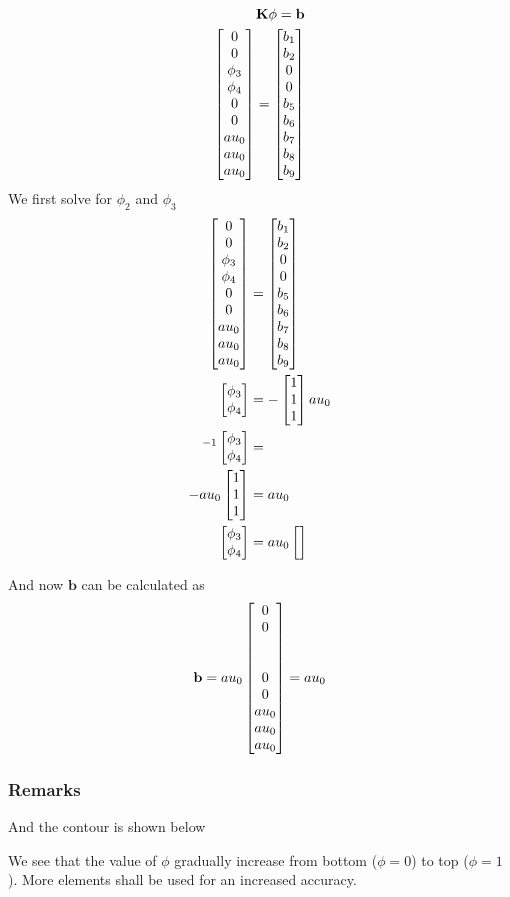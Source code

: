 \begin{align*}
  \K \mathbf{\phi} = \mathbf{b} \notag\\
  \G{K.g} \phin = \bn \notag
\end{align*}
We first solve for $\phi_2$ and $\phi_3$
\def\one{\ensuremath{
    \begin{bmatrix} 1\\1\\1
    \end{bmatrix}}}
\def\pp{\ensuremath{
    \begin{bmatrix} \phi_3 \\ \phi_4
    \end{bmatrix}}}
\begin{align}
  \G{K.g.sm} \phin &= \bn \notag\\
  \G{K.g.m1} \pp &= - \G{K.g.m2} \one \au \notag\\
  \G{K.g.m1}^{-1} \pp &= \G{K.g.mi.inv} \notag\\
  -\au \G{K.g.m2} \one &= \au \G{K.g.m3} \notag\\
  \pp &= \au \begin{bmatrix} \G{phi3}\\\G{phi4} \end{bmatrix} \notag
\end{align}

And now $\mathbf{b}$ can be calculated as
\begin{align}
  \mathbf{b} = \au \G{K.g}
  \begin{bmatrix}
    0\\0\\\G{phi3}\\\G{phi4}\\0\\0\\ \au \\ \au \\ \au
  \end{bmatrix}
  = \au \G{b.n}
\end{align}

\subsubsection*{Remarks}
And the contour is shown below



We see that the value of $\phi$ gradually increase from bottom ($\phi=0$) to
top ($\phi=1$). More elements shall be used for an increased accuracy.
